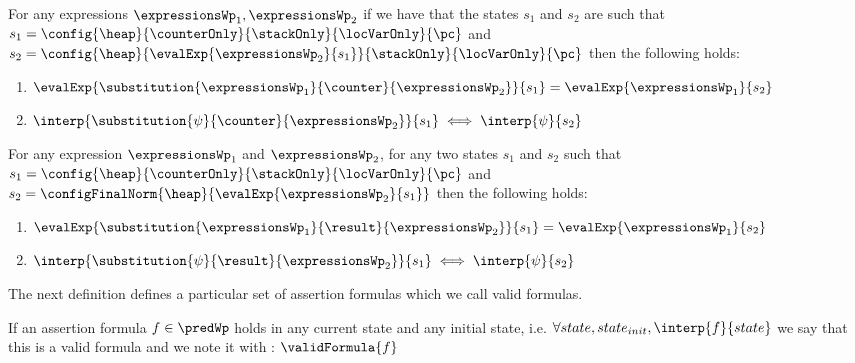 \begin{substCntr}\label{substCntr}
For any expressions $ \expressionsWp_1, \expressionsWp_2 $ 
if we have that the states $s_1$ and $s_2$ are such that
 $s_1 =   \config{\heap}{\counterOnly}{ \stackOnly }{\locVarOnly}{\pc }$ and 
$s_2 =  \config{\heap}{\evalExp{ \expressionsWp_2}{ s_1  } }{ \stackOnly }{\locVarOnly}{\pc }  $ then 
the following holds:
\begin{enumerate}
      \item $\evalExp{\substitution{\expressionsWp_1}{ \counter }{ \expressionsWp_2 }}{ s_1 } = \evalExp{\expressionsWp_1}{s_2} $
      \item $\interp{\substitution{\psi}{ \counter }{ \expressionsWp_2 }}{ s_1 } \iff \interp{\psi}{s_2} $
\end{enumerate}
\end{substCntr} 




\begin{substRet}\label{substRet} 
For any expression $\expressionsWp_1$ and $\expressionsWp_2$,
for any two states $s_1$ and $s_2$  such that
$ s_1 =   \config{\heap}{\counterOnly}{ \stackOnly }{\locVarOnly}{\pc }$ and \\
$ s_2 =   \configFinalNorm{\heap}{\evalExp{\expressionsWp_2}{s_1} } $ then 
the following holds:
\begin{enumerate}
      \item $\evalExp{\substitution{\expressionsWp_1}{ \result }{ \expressionsWp_2 }}{ s_1 } = \evalExp{\expressionsWp_1}{s_2} $
      \item $\interp{\substitution{\psi}{ \result}{ \expressionsWp_2 }}{ s_1 } \iff \interp{\psi}{s_2} $
\end{enumerate}
\end{substRet}


The next definition defines a particular set of assertion formulas which we call valid formulas.
\begin{valid}
  If an assertion formula  $ f \in \predWp $ holds in any current state and any initial state, i.e.
$\forall state, state_{init}, \interp{f}{state} $ we say that this is a valid formula and we note it with :
  $\validFormula{f} $ 
\end{valid}




